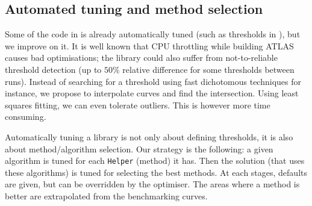 \subsection{Automated tuning and method selection}
%
Some of the code in \linbox is already automatically tuned (such as thresholds
in \fgemm), but we improve on it. It is well known that CPU throttling while
building ATLAS causes bad optimisations; the \fflasffpack library could also
suffer from not-to-reliable threshold detection (up to $50\%$ relative
difference for some thresholds between runs). Instead of searching for a
threshold using fast dichotomous techniques for instance, we propose to
interpolate curves and find the intersection. Using least squares fitting, we
can even tolerate outliers. This is however more time consuming.
%
\par
%
Automatically tuning a library is not only about defining thresholds, it is
also about method/algorithm selection. Our strategy is the following: a given
algorithm is tuned for each {\tt Helper} (method) it has.  Then the solution
(that uses these algorithms) is tuned for selecting the best methods.  At each
stages, defaults are given, but can be overridden by the optimiser. The areas
where a method is better are extrapolated from the benchmarking curves.
